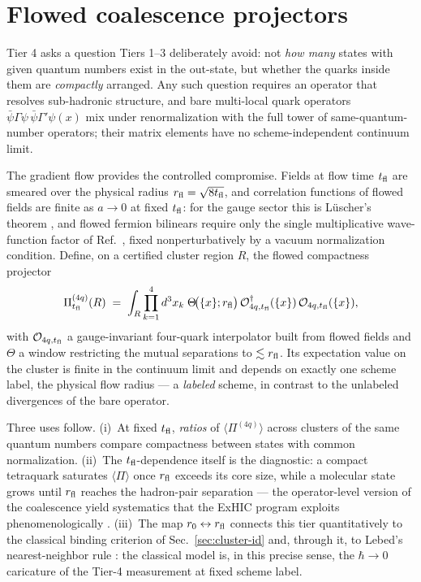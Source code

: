 \section{Flowed coalescence projectors}
\label{app:flowed}

Tier 4 asks a question Tiers 1--3 deliberately avoid: not \emph{how
many} states with given quantum numbers exist in the out-state, but
whether the quarks inside them are \emph{compactly} arranged.  Any
such question requires an operator that resolves sub-hadronic
structure, and bare multi-local quark operators
$\bar\psi\Gamma\psi\,\bar\psi\Gamma'\psi(x)$ mix under
renormalization with the full tower of same-quantum-number operators;
their matrix elements have no scheme-independent continuum limit.

The gradient flow provides the controlled compromise.  Fields at flow
time $t_{\rm fl}$ are smeared over the physical radius
$r_{\rm fl}=\sqrt{8t_{\rm fl}}$, and correlation functions of flowed
fields are finite as $a\to0$ at fixed $t_{\rm fl}$: for the gauge
sector this is L\"uscher's theorem \cite{Luscher:2010iy}, and flowed
fermion bilinears require only the single multiplicative wave-function
factor of Ref.~\cite{Makino:2014taa}, fixed nonperturbatively by a
vacuum normalization condition.  Define, on a certified cluster region
$R$, the flowed compactness projector
\begin{equation}
\Pi^{(4q)}_{t_{\rm fl}}(R) \;=\;
\int_R \prod_{k=1}^{4} d^3x_k \;
\Theta\!\big(\{x\};r_{\rm fl}\big)\,
\mathcal O^\dagger_{4q,t_{\rm fl}}(\{x\})\,
\mathcal O_{4q,t_{\rm fl}}(\{x\}),
\end{equation}
with $\mathcal O_{4q,t_{\rm fl}}$ a gauge-invariant four-quark
interpolator built from flowed fields and $\Theta$ a window
restricting the mutual separations to $\lesssim r_{\rm fl}$.  Its
expectation value on the cluster is finite in the continuum limit and
depends on exactly one scheme label, the physical flow radius --- a
\emph{labeled} scheme, in contrast to the unlabeled divergences of the
bare operator.

Three uses follow.  (i)~At fixed $t_{\rm fl}$, \emph{ratios} of
$\langle\Pi^{(4q)}\rangle$ across clusters of the same quantum numbers
compare compactness between states with common normalization.
(ii)~The $t_{\rm fl}$-dependence itself is the diagnostic: a compact
tetraquark saturates $\langle\Pi\rangle$ once $r_{\rm fl}$ exceeds its
core size, while a molecular state grows until $r_{\rm fl}$ reaches
the hadron-pair separation --- the operator-level version of the
coalescence yield systematics that the ExHIC program exploits
phenomenologically \cite{ExHIC:2010gcb,ExHIC:2017smd}.  (iii)~The map
$r_0 \leftrightarrow r_{\rm fl}$ connects this tier quantitatively to
the classical binding criterion of Sec.~\ref{sec:cluster-id} and,
through it, to Lebed's nearest-neighbor rule \cite{Lebed:2016jvq}:
the classical model is, in this precise sense, the
$\hbar\to0$ caricature of the Tier-4 measurement at fixed scheme
label.

